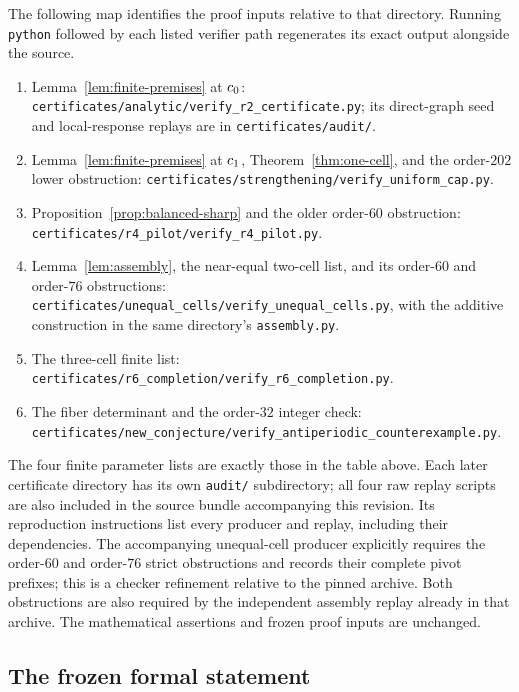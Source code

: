 The following map identifies the proof inputs relative to that directory.
Running \texttt{python} followed by each listed verifier path regenerates
its exact output alongside the source.
\begin{enumerate}
\item Lemma~\ref{lem:finite-premises} at $c_0$:
\nolinkurl{certificates/analytic/verify_r2_certificate.py};
its direct-graph seed and local-response replays are in
\nolinkurl{certificates/audit/}.
\item Lemma~\ref{lem:finite-premises} at $c_1$,
Theorem~\ref{thm:one-cell}, and the order-$202$ lower obstruction:
\nolinkurl{certificates/strengthening/verify_uniform_cap.py}.
\item Proposition~\ref{prop:balanced-sharp} and the older order-$60$
obstruction: \nolinkurl{certificates/r4_pilot/verify_r4_pilot.py}.
\item Lemma~\ref{lem:assembly}, the near-equal two-cell list, and its
order-$60$ and order-$76$ obstructions:
\nolinkurl{certificates/unequal_cells/verify_unequal_cells.py},
with the additive construction in the same directory's
\nolinkurl{assembly.py}.
\item The three-cell finite list:
\nolinkurl{certificates/r6_completion/verify_r6_completion.py}.
\item The fiber determinant and the order-$32$ integer check:
\nolinkurl{certificates/new_conjecture/verify_antiperiodic_counterexample.py}.
\end{enumerate}
The four finite parameter lists are exactly those in the table above.
Each later certificate directory has its own \nolinkurl{audit/}
subdirectory; all four raw replay scripts are also included in the source
bundle accompanying this revision. Its reproduction instructions list every
producer and replay, including their dependencies. The accompanying
unequal-cell producer explicitly requires the order-$60$ and order-$76$
strict obstructions and records their complete pivot prefixes; this is a
checker refinement relative to the pinned archive. Both obstructions are
also required by the independent assembly replay already in that archive.
The mathematical assertions and frozen proof inputs are unchanged.

\subsection{The frozen formal statement}

